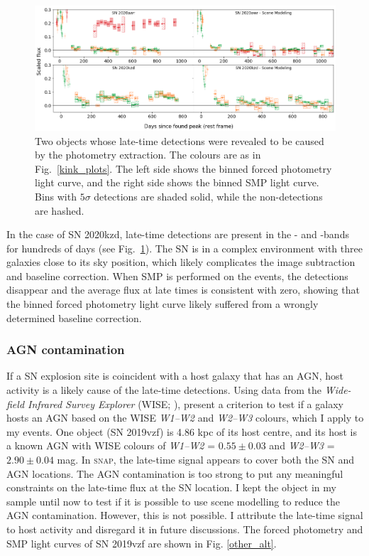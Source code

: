 \documentclass[a4paper,oneside,12pt, class=Latex/Classes/PhDthesisPSnPDF, crop=false]{standalone}
\begin{document}
\begin{figure}
 \centering
 \includegraphics[width=\textwidth]{../Images/chapter_3/other_red_err_plots.png}
 \caption{Two objects whose late-time detections were revealed to be caused by the photometry extraction. The colours are as in Fig.~\ref{kink_plots}. The left side shows the binned forced photometry light curve, and the right side shows the binned SMP light curve. Bins with $5\sigma$ detections are shaded solid, while the non-detections are hashed.}
 \label{other_red_errs}
\end{figure}

In the case of SN 2020kzd, late-time detections are present in the \ztfg- and \ztfr-bands for hundreds of days (see Fig.~\ref{other_red_errs}). The SN is in a complex environment with three galaxies close to its sky position, which likely complicates the image subtraction and baseline correction. When SMP is performed on the events, the detections disappear and the average flux at late times is consistent with zero, showing that the binned forced photometry light curve likely suffered from a wrongly determined baseline correction.

\subsubsection{AGN contamination}
\label{sec:agn_cont}
If a SN explosion site is coincident with a host galaxy that has an AGN, host activity is a likely cause of the late-time detections. Using data from the \textit{Wide-field Infrared Survey Explorer} (WISE; \citealt{WISE}), \citet{WISE_crit} present a criterion to test if a galaxy hosts an AGN based on the WISE \textit{W1--W2} and \textit{W2--W3} colours, which I apply to my events. One object (SN 2019vzf) is 4.86 kpc of its host centre, and its host is a known AGN with WISE colours of \textit{W1--W2} = $0.55\pm0.03$ and \textit{W2--W3} = $2.90\pm0.04$ mag. In \textsc{snap}, the late-time signal appears to cover both the SN and AGN locations. The AGN contamination is too strong to put any meaningful constraints on the late-time flux at the SN location. I kept the object in my sample until now to test if it is possible to use scene modelling to reduce the AGN contamination. However, this is not possible. I attribute the late-time signal to host activity and disregard it in future discussions. The forced photometry and SMP light curves of SN 2019vzf are shown in Fig. \ref{other_alt}. 
\end{document}

